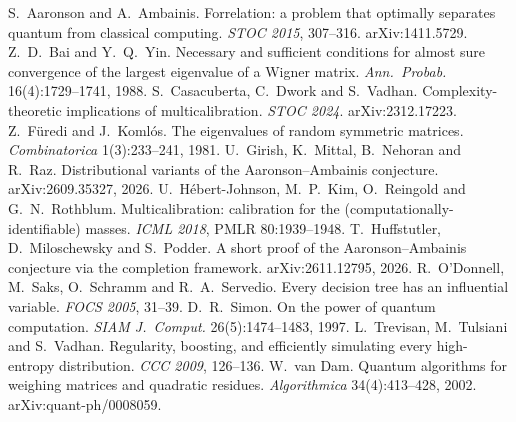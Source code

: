  S.~Aaronson and A.~Ambainis. Forrelation: a problem that optimally separates quantum from classical computing. \emph{STOC 2015}, 307--316. arXiv:1411.5729.
 Z.~D.~Bai and Y.~Q.~Yin. Necessary and sufficient conditions for almost sure convergence of the largest eigenvalue of a Wigner matrix. \emph{Ann.\ Probab.} 16(4):1729--1741, 1988.
 S.~Casacuberta, C.~Dwork and S.~Vadhan. Complexity-theoretic implications of multicalibration. \emph{STOC 2024}. arXiv:2312.17223.
 Z.~Füredi and J.~Komlós. The eigenvalues of random symmetric matrices. \emph{Combinatorica} 1(3):233--241, 1981.
 U.~Girish, K.~Mittal, B.~Nehoran and R.~Raz. Distributional variants of the Aaronson--Ambainis conjecture. arXiv:2609.35327, 2026.
 U.~Hébert-Johnson, M.~P.~Kim, O.~Reingold and G.~N.~Rothblum. Multicalibration: calibration for the (computationally-identifiable) masses. \emph{ICML 2018}, PMLR 80:1939--1948.
 T.~Huffstutler, D.~Miloschewsky and S.~Podder. A short proof of the Aaronson--Ambainis conjecture via the completion framework. arXiv:2611.12795, 2026.
 R.~O'Donnell, M.~Saks, O.~Schramm and R.~A.~Servedio. Every decision tree has an influential variable. \emph{FOCS 2005}, 31--39.
 D.~R.~Simon. On the power of quantum computation. \emph{SIAM J.\ Comput.} 26(5):1474--1483, 1997.
 L.~Trevisan, M.~Tulsiani and S.~Vadhan. Regularity, boosting, and efficiently simulating every high-entropy distribution. \emph{CCC 2009}, 126--136.
 W.~van Dam. Quantum algorithms for weighing matrices and quadratic residues. \emph{Algorithmica} 34(4):413--428, 2002. arXiv:quant-ph/0008059.
